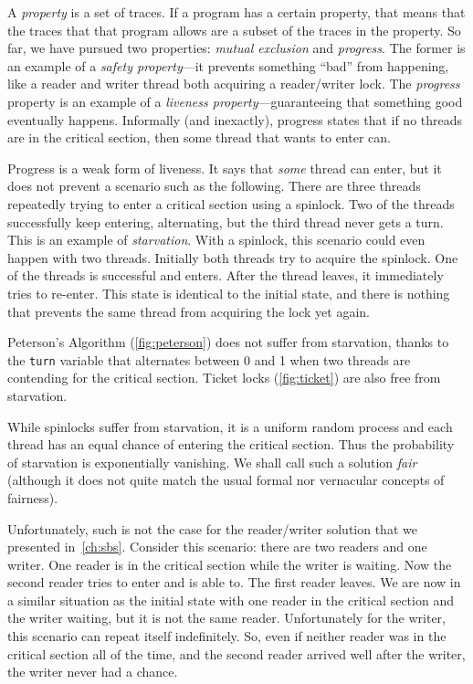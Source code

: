 \documentclass{report}
\begin{document}
%

A \emph{property}
%
is a set of traces.
If a program has a certain property, that means that the traces that that
program allows are a subset of the traces in the property.
So far, we have pursued two properties: \emph{mutual exclusion}
and \emph{progress}.  The former is an example of a
\emph{safety property}---it prevents something ``bad'' from
happening, like a reader and writer thread both acquiring a
reader/writer lock.
The \emph{progress} property is an example
of a \emph{liveness property}---guaranteeing that something good
eventually happens.
Informally (and inexactly), progress states that if no threads
are in the critical section, then some thread that wants to enter
can.

Progress is a weak form of liveness.  It says that \emph{some}
thread can enter, but it does not prevent a scenario such as
the following.  There are three threads repeatedly trying to
enter a critical section using a spinlock.  Two of
the threads successfully keep entering, alternating, but the third
thread never gets a turn.  This is an example of
\emph{starvation}.  With a spinlock, this scenario could
even happen with two threads.  Initially both threads
try to acquire the spinlock.  One of the threads is
successful and enters.  After the thread leaves, it immediately
tries to re-enter.  This state is identical to the initial
state, and there is nothing that prevents the same thread
from acquiring the lock yet again.

Peterson's Algorithm (\autoref{fig:peterson})
does not suffer from starvation, thanks to the \texttt{turn} variable
that alternates between 0 and 1 when two threads are contending for
the critical section.
Ticket locks (\autoref{fig:ticket}) are also free from starvation.

While spinlocks suffer from starvation, it is a uniform random
process and each thread has an equal chance of entering the critical
section.  Thus the probability of starvation is exponentially vanishing.
We shall call such a solution \emph{fair}
%
(although it does not quite
match the usual formal nor vernacular concepts of fairness).

%

Unfortunately, such is not the case for the
reader/writer solution that we presented in~\autoref{ch:sbs}.
Consider this scenario: there are two readers and one writer.  One reader
is in the critical section while the writer is waiting.  Now the
second reader tries to enter and is able to.  The first reader leaves.
We are now in a similar situation as the initial state with one reader
in the critical section and the writer waiting, but it is not the same
reader.  Unfortunately for the writer, this scenario can repeat itself
indefinitely.  So, even if neither reader was in the critical section
all of the time, and the second reader arrived well after the writer,
the writer never had a chance.
\end{document}
